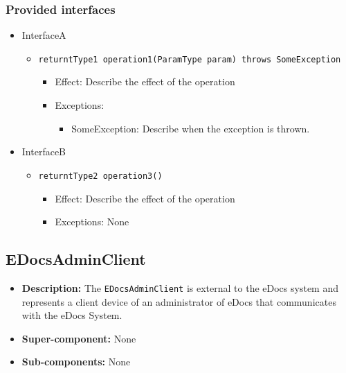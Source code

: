 \documentclass[a4paper,10pt]{article}
\begin{document}
\subsubsection*{Provided interfaces}
\begin{itemize}
    \item InterfaceA
    \begin{itemize}
        \item \texttt{returntType1 operation1(ParamType param) throws SomeException}
        \begin{itemize}
            \item Effect: Describe the effect of the operation
            \item Exceptions:
            \begin{itemize}
                \item SomeException: Describe when the exception is thrown.
            \end{itemize}
        \end{itemize}
    \end{itemize}

    \item InterfaceB
    \begin{itemize}
        \item \texttt{returntType2 operation3()}
        \begin{itemize}
            \item Effect: Describe the effect of the operation
            \item Exceptions: None
        \end{itemize}
    \end{itemize}
\end{itemize}

\subsection{EDocsAdminClient}
\begin{itemize}
    \item \textbf{Description:} The \texttt{EDocsAdminClient} is external to the eDocs system and represents a client device of an administrator of eDocs that communicates with the eDocs System.
    \item \textbf{Super-component:} None
    \item \textbf{Sub-components:} None
\end{itemize}
\end{document}
